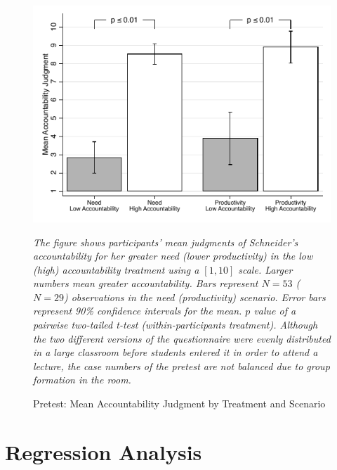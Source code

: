 \documentclass[smallcondensed]{svjour3}
\begin{document}
\begin{figure}[ht]
   \centering
   \includegraphics[scale=0.7]{figures/pilot_accountability.pdf}
   \begin{minipage}{10cm}
   \footnotesize
   \emph{The figure shows participants' mean judgments of Schneider's accountability for her greater need (lower productivity) in the low (high) accountability treatment using a $[1,10]$ scale. Larger numbers mean greater accountability. Bars represent $N=53$ ($N=29$) observations in the need (productivity) scenario. Error bars represent 90\% confidence intervals for the mean. $p$ value of a pairwise two-tailed t-test (within-participants treatment). Although the two different versions of the questionnaire were evenly distributed in a large classroom before students entered it in order to attend a lecture, the case numbers of the pretest are not balanced due to group formation in the room.}
   \end{minipage}
   \caption{Pretest: Mean Accountability Judgment by Treatment and Scenario}
   \label{fig:pretest}
\end{figure}
%
\clearpage
%
\section{Regression Analysis}\label{sec:regression}
%
\end{document}

